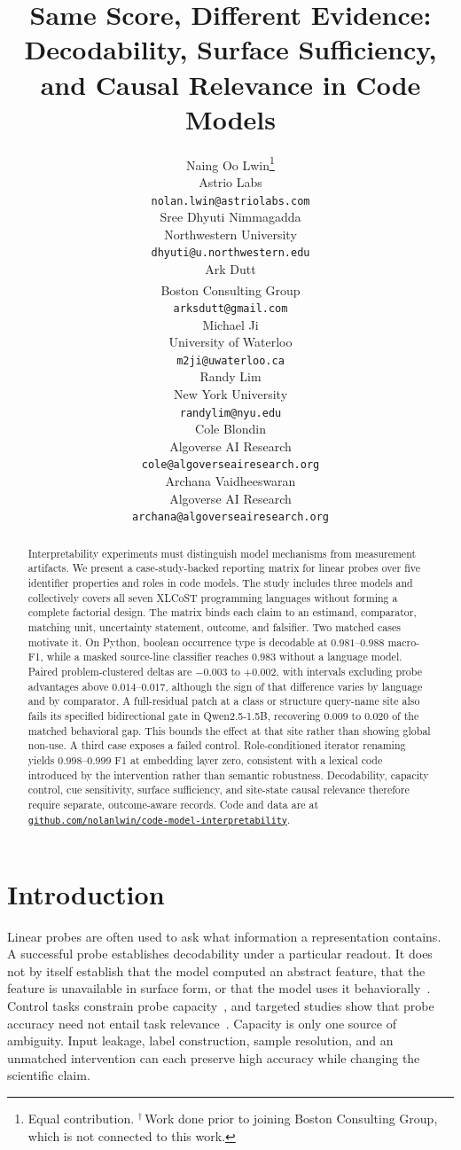 \documentclass{article}
\title{Same Score, Different Evidence:\\Decodability, Surface Sufficiency, and Causal Relevance in Code Models}
\author{%
  Naing Oo Lwin\thanks{Equal contribution. $^{\dagger}$\,Work done prior to joining Boston Consulting Group, which is not connected to this work.} \\
  Astrio Labs \\
  {\small\texttt{nolan.lwin@astriolabs.com}} \\
  \And
  Sree Dhyuti Nimmagadda\footnotemark[1] \\
  Northwestern University \\
  {\small\texttt{dhyuti@u.northwestern.edu}} \\
  \And
  Ark Dutt\footnotemark[1] \\
  Boston Consulting Group\textsuperscript{\dag} \\
  {\small\texttt{arksdutt@gmail.com}} \\
  \AND
  Michael Ji\footnotemark[1] \\
  University of Waterloo \\
  {\small\texttt{m2ji@uwaterloo.ca}} \\
  \And
  Randy Lim\footnotemark[1] \\
  New York University \\
  {\small\texttt{randylim@nyu.edu}} \\
  \AND
  Cole Blondin \\
  Algoverse AI Research \\
  {\small\texttt{cole@algoverseairesearch.org}} \\
  \And
  Archana Vaidheeswaran \\
  Algoverse AI Research \\
  {\small\texttt{archana@algoverseairesearch.org}} \\
}
\begin{document}
\maketitle

\begin{abstract}
Interpretability experiments must distinguish model mechanisms from
measurement artifacts. We present a case-study-backed reporting matrix for
linear probes over five identifier properties and roles in code models. The
study includes three models and collectively covers all seven XLCoST
programming languages without forming a complete factorial design. The matrix
binds each claim to an estimand, comparator, matching unit, uncertainty
statement, outcome, and falsifier. Two matched cases motivate it. On Python,
boolean occurrence type is decodable at $0.981$--$0.988$ macro-F1, while a
masked source-line classifier reaches $0.983$ without a language model.
Paired problem-clustered deltas are $-0.003$ to $+0.002$, with intervals
excluding probe advantages above $0.014$--$0.017$, although the sign of that
difference varies by language and by comparator. A full-residual patch at a
class or structure query-name site also fails its specified bidirectional gate
in Qwen2.5-1.5B, recovering $0.009$ to $0.020$ of the matched behavioral gap.
This bounds the effect at that site rather than showing global non-use. A
third case exposes a failed control. Role-conditioned iterator renaming yields
$0.998$--$0.999$ F1 at embedding layer zero, consistent with a lexical code
introduced by the intervention rather than semantic robustness. Decodability,
capacity control, cue sensitivity, surface sufficiency, and site-state causal
relevance therefore require separate, outcome-aware records. Code and data
are at \href{https://github.com/nolanlwin/code-model-interpretability}{\nolinkurl{github.com/nolanlwin/code-model-interpretability}}.
\end{abstract}

\section{Introduction}

Linear probes are often used to ask what information a representation contains.
A successful probe establishes decodability under a particular readout. It
does not by itself establish that the model computed an abstract feature, that
the feature is unavailable in surface form, or that the model uses it
behaviorally~\citep{belinkov2022probing,voita2020mdl}. Control tasks constrain
probe capacity~\citep{hewitt2019control}, and targeted studies show that probe
accuracy need not entail task relevance~\citep{ravichander2021probing,
elazar2021amnesic}. Capacity is only one source of
ambiguity. Input leakage, label construction, sample resolution, and an
unmatched intervention can each preserve high accuracy while changing the
scientific claim.
\end{document}
